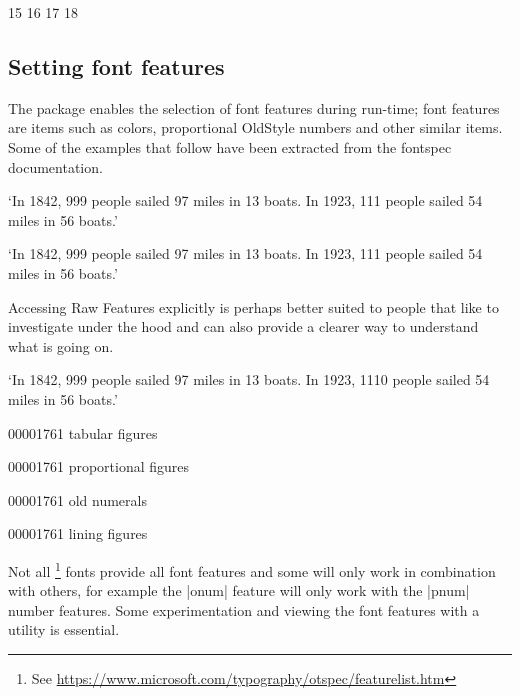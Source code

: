 \begin{teX}
15 \DeclareTextFontCommand{\textrm}{\rmfamily}
16 \DeclareTextFontCommand{\textsf}{\sffamily}
17 \DeclareTextFontCommand{\texttt}{\ttfamily}
18 \DeclareTextFontCommand{\textnormal}{\normalfont}
\end{teX}

\subsection{Setting font features}

The  package enables the selection of font features during run-time; font features are items such as colors, proportional OldStyle numbers and other similar items. Some of the examples that follow have been extracted from the fontspec documentation.

\ifxetex\else\if\luatex
\begin{texexample}{}{}
`In 1842, 999 people sailed 97 miles in
13 boats. In 1923, 111 people sailed 54
miles in 56 boats.' \bigskip

`In 1842, 999 people sailed 97 miles in
13 boats. In 1923, 111 people sailed 54
miles in 56 boats.' \bigskip
\end{texexample}

Accessing Raw Features explicitly is perhaps better suited to people that like to investigate under the hood and can also provide a clearer way to understand what is going on.
 
\begin{texexample}{}{}
`In 1842, 999 people sailed 97 miles in
13 boats. In 1923, 1110 people sailed 54
miles in 56 boats.' \bigskip

00001761 tabular figures \fox \bigskip

00001761 proportional figures \bigskip

00001761 old numerals\bigskip

00001761 lining figures\bigskip
\end{texexample}

Not all \OpenType\footnote{See \protect\url{https://www.microsoft.com/typography/otspec/featurelist.htm}} fonts provide all font features and some will only work in combination with others, for example the |onum| feature will only work with the |pnum| number features. Some experimentation and viewing the font features with a utility is essential.

